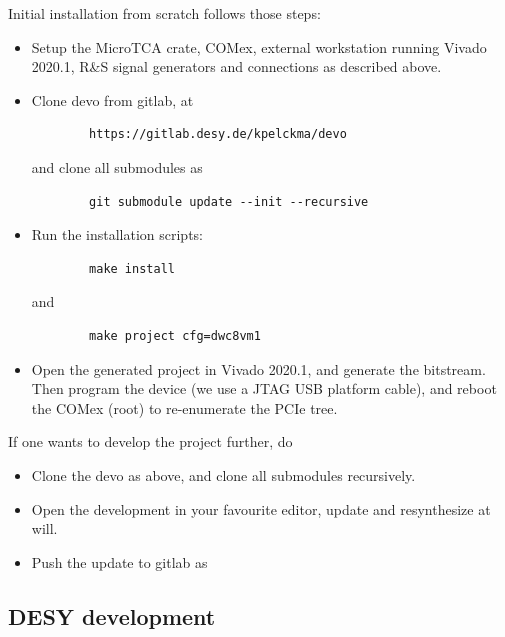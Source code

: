 \documentclass[12pt]{amsart}
\begin{document}
Initial installation from scratch follows those steps:
\begin{itemize}
\item Setup the MicroTCA crate, COMex, external workstation running Vivado 2020.1, R\&S signal generators and  connections as 
	described above.
	
\item Clone devo from gitlab, at 
	\begin{verbatim}
		https://gitlab.desy.de/kpelckma/devo
	\end{verbatim}	
	and clone all submodules as
	\begin{verbatim}
		git submodule update --init --recursive
	\end{verbatim}	
	
\item Run the installation scripts:
	\begin{verbatim}
		make install
	\end{verbatim}
	and 
	\begin{verbatim}
		make project cfg=dwc8vm1
	\end{verbatim}
	
\item Open the generated project in Vivado 2020.1, and generate the bitstream. 
 Then program the device (we use a JTAG USB platform cable), and reboot the COMex (root) to re-enumerate the PCIe tree.
\end{itemize}
If one wants to develop the project further, do 
\begin{itemize}
\item Clone the devo as above, and clone all submodules recursively.
\item Open the development in your favourite editor, update and resynthesize at will.
\item Push the update to gitlab as 
\end{itemize}

\subsection{DESY development}
\end{document}
